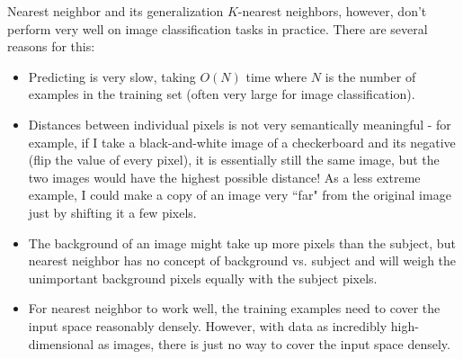 Nearest neighbor and its generalization $K$-nearest neighbors, however, don't perform very well on image classification tasks in practice. There are several reasons for this:
\begin{itemize}
\item Predicting is very slow, taking $O(N)$ time where $N$ is the number of examples in the training set (often very large for image classification).
\item Distances between individual pixels is not very semantically meaningful - for example, if I take a black-and-white image of a checkerboard and its negative (flip the value of every pixel), it is essentially still the same image, but the two images would have the highest possible distance! As a less extreme example, I could make a copy of an image very ``far" from the original image just by shifting it a few pixels.
\item The background of an image might take up more pixels than the subject, but nearest neighbor has no concept of background vs. subject and will weigh the unimportant background pixels equally with the subject pixels.
\item For nearest neighbor to work well, the training examples need to cover the input space reasonably densely. However, with data as incredibly high-dimensional as images, there is just no way to cover the input space densely.
\end{itemize}

